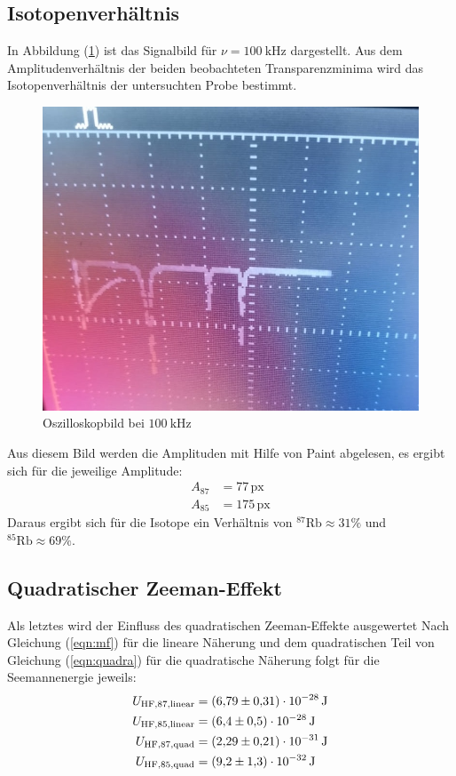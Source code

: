 \subsection{Isotopenverhältnis}
In Abbildung (\ref{fig:signal}) ist das Signalbild für $\nu=\SI{100}{\kilo\hertz}$ dargestellt.
Aus dem Amplitudenverhältnis der beiden beobachteten Transparenzminima wird das Isotopenverhältnis der untersuchten Probe bestimmt.
\begin{figure}[h!]
  \centering
  \includegraphics[scale=0.5]{fig/signal.jpg}
  \caption{Oszilloskopbild bei $\SI{100}{\kilo\hertz}$}
  \label{fig:signal}
\end{figure}
Aus diesem Bild werden die Amplituden mit Hilfe von Paint \cite{paint} abgelesen, es ergibt sich für die jeweilige Amplitude:
\begin{align*}
  A_\mathrm{87} &= 77 \, \mathrm{px} \\
  A_\mathrm{85} &= 175 \,\mathrm{px}
\end{align*}
Daraus ergibt sich für die Isotope ein Verhältnis von $^{87}\mathrm{Rb} \approx 31\%$ und $^{85}\mathrm{Rb} \approx 69\%$.
\subsection{Quadratischer Zeeman-Effekt}
Als letztes wird der Einfluss des quadratischen Zeeman-Effekte ausgewertet
Nach Gleichung (\ref{eqn:mf}) für die lineare Näherung und dem quadratischen Teil von Gleichung (\ref{eqn:quadra}) für die quadratische Näherung folgt für die Seemannenergie jeweils:
\begin{align*}
  U_{\mathrm{HF,87,linear}}&= \SI{6.79 \pm 0.31 e-28}{\joule} \\
  U_{\mathrm{HF,85,linear}}&= \SI{6.4 \pm 0.5 e-28}{\joule} \\
  U_{\mathrm{HF,87,quad}}&= \SI{2.29 \pm 0.21 e-31}{\joule} \\
  U_{\mathrm{HF,85,quad}}&= \SI{9.2 \pm 1.3 e-32}{\joule}
\end{align*}
